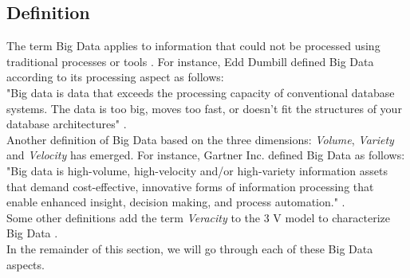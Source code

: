  \subsection{Definition}
The term Big Data applies to information that could not be processed using traditional processes or tools \cite{a:IBM}.
For instance, Edd Dumbill defined Big Data according to its processing aspect as follows:\\
		"Big data is data that exceeds the processing capacity of conventional database systems. The data is too big,   		moves too fast, or doesn’t fit the structures of your database architectures" \cite{a:def1}.\\
Another definition of Big Data based on the three dimensions: \textit{Volume}, \textit{Variety} and \textit{Velocity} has emerged. For instance, Gartner Inc. defined Big Data as follows: \\
		"Big data is high-volume, high-velocity and/or high-variety information assets that demand cost-effective, innovative forms of information processing that enable enhanced insight, decision making, and process automation." \cite{a:gartner}.\\
	Some other definitions add the term \textit{Veracity} to the 3 V model to characterize Big Data \cite{a:veracity}.\\
	In the remainder of this section, we will go through each of these Big Data aspects. 
